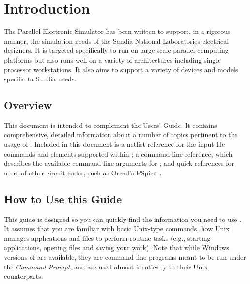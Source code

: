 


\chapter{Introduction}
\label{Introduction}

{
The \XyceTM{} Parallel Electronic Simulator has been written to support, in a
rigorous manner, the simulation needs of the Sandia National Laboratories
 electrical designers.  It is targeted 
specifically to run on large-scale parallel computing
 platforms but also runs well on a variety
of architectures including single processor workstations.  It also aims to
support a variety of devices and models specific to Sandia needs.
}
\section{Overview}
\label{Overview}

This document is intended to complement the \Xyce{} Users' 
Guide\UsersGuide.  It contains comprehensive, detailed
information about a number of topics pertinent to the usage of \Xyce{}.  
Included in this document is a
netlist reference for the input-file commands and elements supported 
within \Xyce{}; a command line reference, which describes the 
available command line arguments for \Xyce{}; and quick-references for 
users of other circuit codes, such as Orcad's PSpice~\cite{PSpiceUG:1998}.

\section{How to Use this Guide}
\label{HowTo_Guide}

This guide is designed so you can quickly find the information you need to 
use \Xyce{}.  It assumes that you are familiar with basic Unix-type 
commands, how Unix manages applications and files to 
perform routine tasks (e.g., starting applications, opening files and 
saving your work).  Note that while Windows versions of \Xyce{} are 
available, they are command-line programs meant to be run under the 
\emph{Command Prompt}, and are used almost identically to their Unix counterparts.

